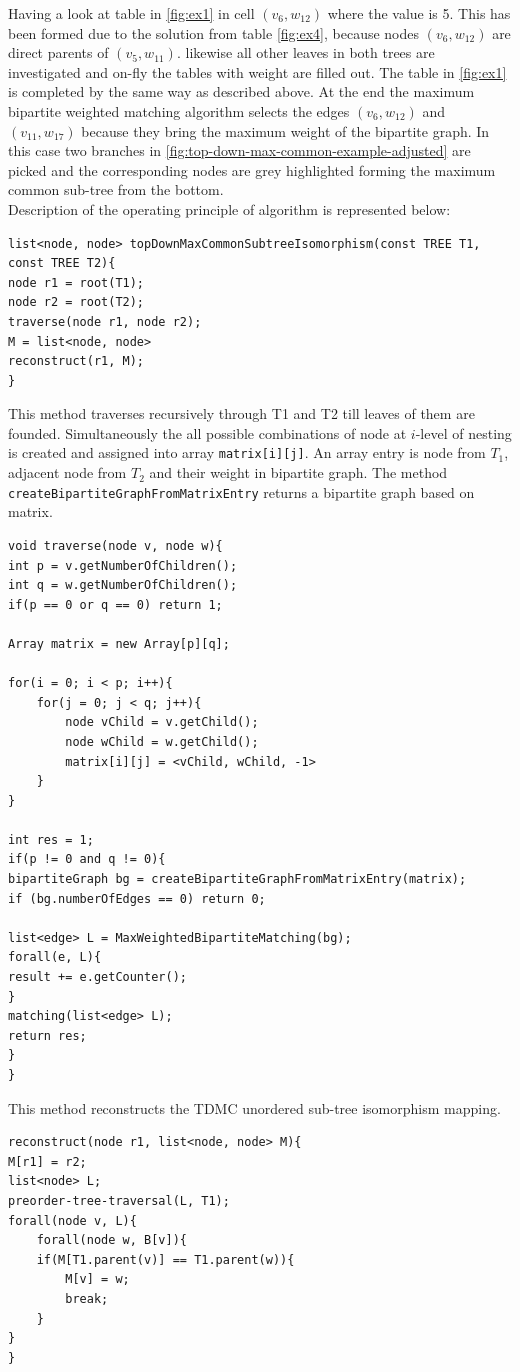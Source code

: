 \documentclass{report}
\begin{document}
Having a look at table in \ref{fig:ex1} in cell $(v_{6},w_{12})$ where the value is 5. This has been formed due to the solution from table \ref{fig:ex4}, because nodes $(v_{6},w_{12})$ are direct parents of $(v_{5},w_{11})$. likewise all other leaves in both trees are investigated and on-fly the tables with weight are filled out. The table in \ref{fig:ex1} is completed by the same way as described above. At the end the maximum bipartite weighted matching algorithm selects the edges $(v_{6},w_{12})$ and $(v_{11},w_{17})$ because they bring the maximum weight of the bipartite graph. In this case two branches in \ref{fig:top-down-max-common-example-adjusted} are picked and the corresponding nodes are grey highlighted forming the maximum common sub-tree from the bottom.\\
Description of the operating principle of algorithm is represented  below:

\begin{lstlisting}
list<node, node> topDownMaxCommonSubtreeIsomorphism(const TREE T1, const TREE T2){
node r1 = root(T1);
node r2 = root(T2);
traverse(node r1, node r2);
M = list<node, node>
reconstruct(r1, M);
}
\end{lstlisting}

This method traverses recursively through T1 and T2 till leaves of them are founded. Simultaneously the all possible combinations of node at $i$-level of nesting is created and assigned into array \texttt{matrix[i][j]}. An array entry is node from $T_{1}$, adjacent node from $T_{2}$ and their weight in bipartite graph.
The method \texttt{createBipartiteGraphFromMatrixEntry} returns a bipartite graph based on matrix.
\begin{lstlisting}
void traverse(node v, node w){
int p = v.getNumberOfChildren();
int q = w.getNumberOfChildren();
if(p == 0 or q == 0) return 1;

Array matrix = new Array[p][q];

for(i = 0; i < p; i++){
	for(j = 0; j < q; j++){
		node vChild = v.getChild();	
		node wChild = w.getChild();
		matrix[i][j] = <vChild, wChild, -1>
	}
}

int res = 1;
if(p != 0 and q != 0){
bipartiteGraph bg = createBipartiteGraphFromMatrixEntry(matrix);
if (bg.numberOfEdges == 0) return 0;

list<edge> L = MaxWeightedBipartiteMatching(bg);
forall(e, L){
result += e.getCounter();
}
matching(list<edge> L);
return res;
}
}
\end{lstlisting}
\newpage
This method reconstructs the TDMC unordered sub-tree isomorphism mapping.
\begin{lstlisting}
reconstruct(node r1, list<node, node> M){
M[r1] = r2;
list<node> L;
preorder-tree-traversal(L, T1);
forall(node v, L){
	forall(node w, B[v]){
	if(M[T1.parent(v)] == T1.parent(w)){
		M[v] = w;
		break;	
	}
}
}
\end{lstlisting}
\end{document}

